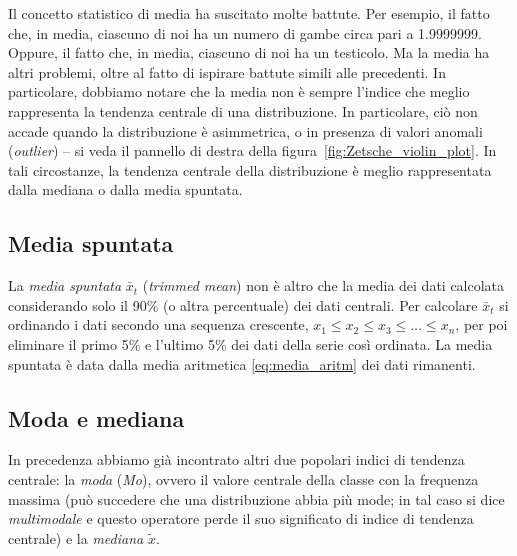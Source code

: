 Il concetto statistico di media ha suscitato molte battute.
Per esempio, il fatto che, in media, ciascuno di noi ha un numero di gambe circa pari a 1.9999999.
Oppure, il fatto che, in media, ciascuno di noi ha un testicolo.
Ma la media ha altri problemi, oltre al fatto di ispirare battute simili alle precedenti.
In particolare, dobbiamo notare che la media non è sempre l'indice che meglio rappresenta la tendenza centrale di una distribuzione. 
In particolare, ciò non accade quando la distribuzione è asimmetrica, o in presenza di valori anomali (\emph{outlier}) -- si veda il pannello di destra della figura~\ref{fig:Zetsche_violin_plot}. 
In tali circostanze, la tendenza centrale della distribuzione è meglio rappresentata dalla mediana o dalla media spuntata.


\subsection{Media spuntata}

La \emph{media spuntata} $\bar{x}_t$ (\emph{trimmed mean}) non è altro che la media dei dati calcolata considerando solo il 90\% (o altra percentuale) dei dati centrali. 
Per calcolare $\bar{x}_t$ si ordinando i dati secondo una sequenza crescente, $x_1 \leq x_2 \leq x_3 \leq \dots \leq x_n$, per poi eliminare il primo 5\% e l'ultimo 5\% dei dati della serie così ordinata. 
La media spuntata è data dalla media aritmetica \eqref{eq:media_aritm} dei dati rimanenti.


\subsection{Moda e mediana}

In precedenza abbiamo già incontrato altri due popolari indici di tendenza centrale: la \emph{moda} (\emph{Mo}), ovvero il valore centrale della classe con la frequenza massima (può succedere che una distribuzione abbia più mode; in tal caso si dice \emph{multimodale} e questo operatore perde il suo significato di indice di tendenza centrale) e la \emph{mediana} $\tilde{x}$.

\newcommand\gauss[2]{1/(#2*sqrt(2*pi))*exp(-((x-#1)^2)/(2*#2^2))} 

